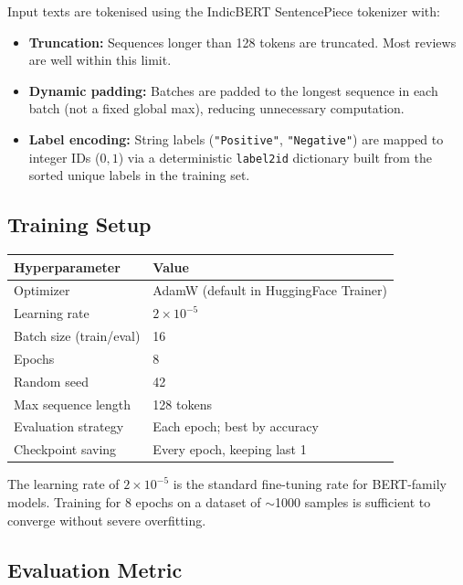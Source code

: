 \documentclass[11pt,a4paper]{article}
\begin{document}
Input texts are tokenised using the IndicBERT SentencePiece tokenizer with:
\begin{itemize}[noitemsep]
    \item \textbf{Truncation:} Sequences longer than 128 tokens are truncated. Most reviews are well within this limit.
    \item \textbf{Dynamic padding:} Batches are padded to the longest sequence in each batch (not a fixed global max), reducing unnecessary computation.
    \item \textbf{Label encoding:} String labels (\texttt{"Positive"}, \texttt{"Negative"}) are mapped to integer IDs ($0, 1$) via a deterministic \texttt{label2id} dictionary built from the sorted unique labels in the training set.
\end{itemize}

\subsection{Training Setup}

\begin{center}
\begin{tabular}{ll}
\toprule
\textbf{Hyperparameter} & \textbf{Value} \\
\midrule
Optimizer               & AdamW (default in HuggingFace Trainer) \\
Learning rate           & $2 \times 10^{-5}$ \\
Batch size (train/eval) & 16 \\
Epochs                  & 8 \\
Random seed             & 42 \\
Max sequence length     & 128 tokens \\
Evaluation strategy     & Each epoch; best by accuracy \\
Checkpoint saving       & Every epoch, keeping last 1 \\
\bottomrule
\end{tabular}
\end{center}

The learning rate of $2 \times 10^{-5}$ is the standard fine-tuning rate for BERT-family models. Training for 8 epochs on a dataset of $\sim$1000 samples is sufficient to converge without severe overfitting.

\subsection{Evaluation Metric}
\end{document}
